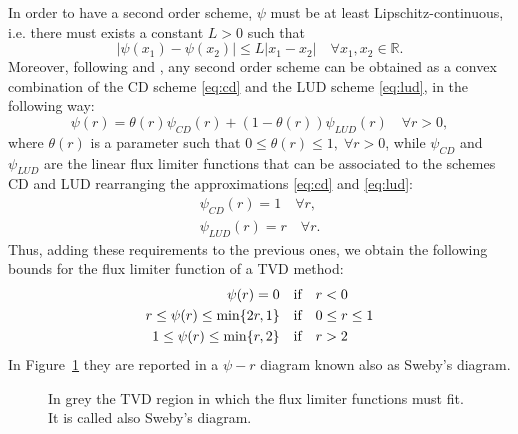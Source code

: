 In order to have a second order scheme, $\psi$ must be at least 
Lipschitz-continuous, i.e. there must exists a constant $L>0$ such that
\begin{equation}
	|\psi(x_1) - \psi (x_2)| \leq L | x_1 - x_2 | \quad \forall x_1, x_2 \in \mathbb{R}.
\end{equation}
Moreover, following \cite{tvd:sweeby} and 
\cite{tvd:vanleer}, any second order scheme 
can be obtained as a convex combination of the CD scheme \eqref{eq:cd} and the 
LUD scheme \eqref{eq:lud}, in the following way:
\begin{equation}
	\psi(r) = \theta(r) \psi_{CD}(r) + (1-\theta(r))\psi_{LUD}(r) \quad \forall 
	r >0,
\end{equation}
where $\theta(r)$ is a parameter such that $0 \leq \theta(r) \leq 1,\; \forall 
r>0$, while $\psi_{CD}$ and $\psi_{LUD}$ are the linear flux limiter functions 
that can be associated to the schemes CD and LUD rearranging the 
approximations \eqref{eq:cd} and \eqref{eq:lud}:
\begin{gather}
	\psi_{CD}(r) = 1 \quad \forall r,\\
	\psi_{LUD}(r) = r \quad \forall r.
\end{gather}
Thus, adding these requirements to the previous ones, we 
obtain the following bounds for the flux limiter function of a TVD method:
\begin{align}
\psi(r) = 0 \quad &\text{if} \quad r < 0 \notag \\
\label{eq:tvdbounds} r \leq \psi(r) \leq \min \{2r, 1\} \quad &\text{if} \quad 
0 
\leq r \leq 1\\
1 \leq \psi(r) \leq \min \{r, 2 \} \quad &\text{if} \quad r > 2 \notag
\end{align}
In Figure~\ref{fig:tvdregion} they are reported in a $\psi-r$ diagram known 
also as Sweby's diagram.
\begin{figure}
	\centering
	
	\caption[TVD region (Sweby's diagram)]{In grey the TVD region in which 
	the flux 
	limiter functions must fit. It is called also Sweby's diagram.}
	\label{fig:tvdregion}
\end{figure}
